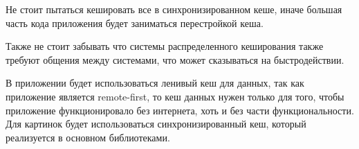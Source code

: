 Не стоит пытаться кешировать все в синхронизированном кеше, иначе большая часть кода приложения будет заниматься перестройкой кеша.

Также не стоит забывать что системы распределенного кеширования также требуют общения между системами, что может сказываться на быстродействии.

В приложении будет использоваться ленивый кеш для данных, так как приложение является remote-first, то кеш данных нужен только для того, чтобы приложение функционировало без интернета, хоть и без части функциональности. Для картинок будет использоваться синхронизированный кеш, который реализуется в основном библиотеками.